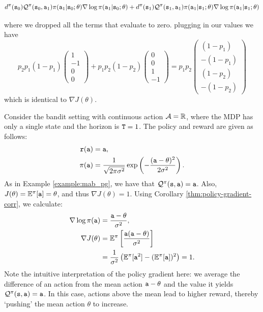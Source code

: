 \begin{example}
\[
d^{\pi}({\tt s}_0)\mathcal{Q}^\pi({\tt s}_0,{\tt a}_1)\pi({\tt a}_1|{\tt s}_0;\theta)
\nabla \log \pi({\tt a}_1|{\tt s}_0;\theta) +
d^{\pi}({\tt s}_1)\mathcal{Q}^\pi({\tt s}_1,{\tt a}_1)\pi({\tt a}_1|{\tt s}_1;\theta)
\nabla \log \pi({\tt a}_1|{\tt s}_1;\theta)
\]

where we dropped all the terms that evaluate to zero. plugging in
our values we have
\[
p_2 p_1 (1-p_1)\begin{pmatrix}1\\-1\\0\\0\end{pmatrix} + p_1 p_2
(1-p_2)\begin{pmatrix}0\\0\\1\\-1\end{pmatrix} = p_1 p_2\begin{pmatrix}(1-p_1)\\
-(1-p_1) \\  (1-p_2) \\ - (1-p_2)\end{pmatrix}
\]
which is identical to $\nabla J(\theta)$.
\end{example}

\begin{example}\label{example:gaussian_bandit}
    Consider the bandit setting with continuous action $\mathcal{A} = \mathbb{R}$, where the MDP has only a single state and the horizon is ${\tt T}=1$. The policy and reward are given as follows:
\begin{equation*}
    \begin{split}
        {\tt r}({\tt a}) &= {\tt a}, \\
        \pi({\tt a}) &= \frac{1}{\sqrt{2 \pi \sigma^2}} \exp \left(- \frac{({\tt a} - \theta)^2}{2 \sigma^2}\right).
    \end{split}
\end{equation*}
As in Example \ref{example:mab_pg}, we have that $\mathcal{Q}^\pi({\tt s},{\tt a})={\tt a}$. 
Also, $J(\theta) = \mathbb{E}^{\pi}[{\tt a}] = \theta$, and thus $\nabla J(\theta) = 1.$
Using Corollary \ref{thm:policy-gradient-corr}, we calculate:
\begin{equation*}
    \begin{split}
        \nabla \log \pi({\tt a}) &= \frac{{\tt a} - \theta}{\sigma^2}, \\
        \nabla J(\theta) &= \mathbb{E}^{\pi} \left[\frac{{\tt a}({\tt a} - \theta)}{\sigma^2}\right] \\
        &= \frac{1}{\sigma^2} \left(\mathbb{E}^{\pi} [{\tt a}^2] - (\mathbb{E}^{\pi} [{\tt a}])^2\right) = 1.
    \end{split}
\end{equation*}
Note the intuitive interpretation of the policy gradient here: we average the difference of an action from the mean action ${\tt a}-\theta$ and the value it yields $\mathcal{Q}^\pi({\tt s},{\tt a})={\tt a}$. In this case, actions above the mean lead to higher reward, thereby `pushing' the mean action $\theta$ to increase. 
\end{example}

